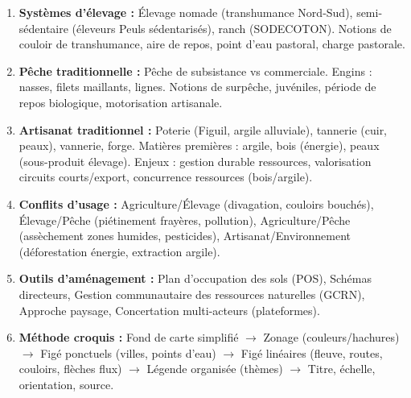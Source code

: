 \documentclass[11pt]{article}
\newcommand{\cle}[1]{{\popxbold\color{popdark}#1}}
\newcounter{popsec}
\newcounter{popsub}
\newcommand{\courssub}[1]{%
  \stepcounter{popsub}%
  \par\vspace{9pt}\noindent{\popxbold\fontsize{11.5}{13}\selectfont\color{popink}{\color{poporange}\thepopsec.\thepopsub}\hspace{6pt}#1}\par\nopagebreak\vspace{4pt}
}
\begin{document}
\courssub{Ressources à mobiliser}
\begin{aretenir}
\begin{enumerate}
    \item \textbf{Systèmes d'élevage :} Élevage nomade (transhumance Nord-Sud), semi-sédentaire (éleveurs Peuls sédentarisés), ranch (SODECOTON). Notions de \cle{couloir de transhumance}, \cle{aire de repos}, \cle{point d'eau pastoral}, \cle{charge pastorale}.
    \item \textbf{Pêche traditionnelle :} Pêche de subsistance vs commerciale. Engins : nasses, filets maillants, lignes. Notions de \cle{surpêche}, \cle{juvéniles}, \cle{période de repos biologique}, \cle{motorisation artisanale}.
    \item \textbf{Artisanat traditionnel :} Poterie (Figuil, argile alluviale), tannerie (cuir, peaux), vannerie, forge. Matières premières : argile, bois (énergie), peaux (sous-produit élevage). Enjeux : \cle{gestion durable ressources}, \cle{valorisation circuits courts/export}, \cle{concurrence ressources (bois/argile)}.
    \item \textbf{Conflits d'usage :} Agriculture/Élevage (divagation, couloirs bouchés), Élevage/Pêche (piétinement frayères, pollution), Agriculture/Pêche (assèchement zones humides, pesticides), Artisanat/Environnement (déforestation énergie, extraction argile).
    \item \textbf{Outils d'aménagement :} \cle{Plan d'occupation des sols (POS)}, \cle{Schémas directeurs}, \cle{Gestion communautaire des ressources naturelles (GCRN)}, \cle{Approche paysage}, \cle{Concertation multi-acteurs (plateformes)}.
    \item \textbf{Méthode croquis :} Fond de carte simplifié $\rightarrow$ Zonage (couleurs/hachures) $\rightarrow$ Figé ponctuels (villes, points d'eau) $\rightarrow$ Figé linéaires (fleuve, routes, couloirs, flèches flux) $\rightarrow$ Légende organisée (thèmes) $\rightarrow$ Titre, échelle, orientation, source.
\end{enumerate}
\end{aretenir}
\end{document}
